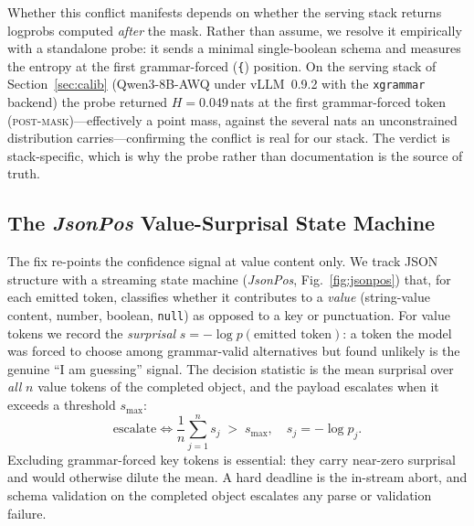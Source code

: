 \documentclass[conference]{IEEEtran}
\begin{document}
Whether this conflict manifests depends on whether the serving stack returns logprobs computed \emph{after} the mask. Rather than assume, we resolve it empirically with a standalone probe: it sends a minimal single-boolean schema and measures the entropy at the first grammar-forced (\texttt{\{}) position. On the serving stack of Section~\ref{sec:calib} (Qwen3-8B-AWQ under vLLM~0.9.2 with the \texttt{xgrammar} backend) the probe returned $H = 0.049$\,nats at the first grammar-forced token (\textsc{post-mask})---effectively a point mass, against the several nats an unconstrained distribution carries---confirming the conflict is real for our stack. The verdict is stack-specific, which is why the probe rather than documentation is the source of truth.

\subsection{The \emph{JsonPos} Value-Surprisal State Machine}
\label{sec:jsonpos}

The fix re-points the confidence signal at value content only. We track JSON structure with a streaming state machine (\emph{JsonPos}, Fig.~\ref{fig:jsonpos}) that, for each emitted token, classifies whether it contributes to a \emph{value} (string-value content, number, boolean, \texttt{null}) as opposed to a key or punctuation. For value tokens we record the \emph{surprisal} $s = -\log p(\text{emitted token})$: a token the model was forced to choose among grammar-valid alternatives but found unlikely is the genuine ``I am guessing'' signal. The decision statistic is the mean surprisal over \emph{all} $n$ value tokens of the completed object, and the payload escalates when it exceeds a threshold $s_{\max}$:
\begin{equation}
\text{escalate} \iff \frac{1}{n}\sum_{j=1}^{n} s_j \; > \; s_{\max}, \quad s_j = -\log p_j.
\label{eq:guard}
\end{equation}
Excluding grammar-forced key tokens is essential: they carry near-zero surprisal and would otherwise dilute the mean. A hard deadline is the in-stream abort, and schema validation on the completed object escalates any parse or validation failure.
\end{document}

